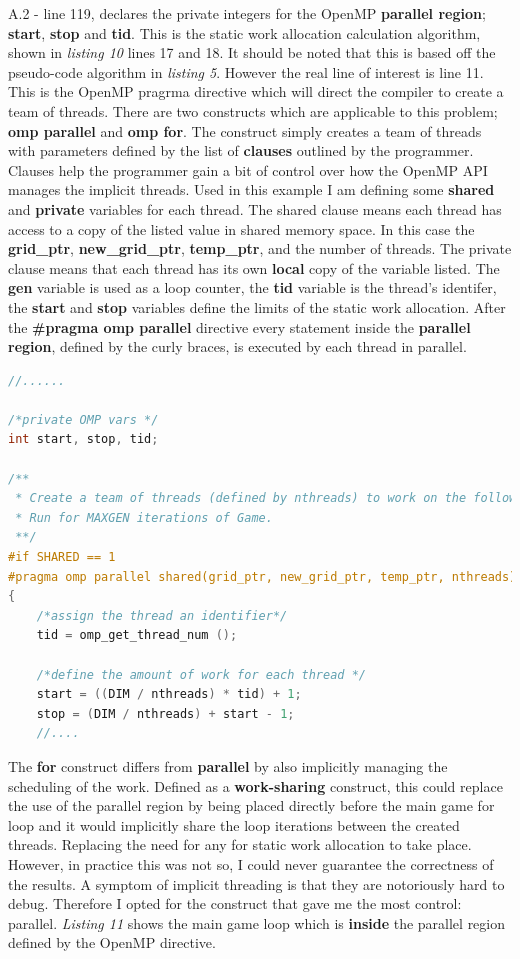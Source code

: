 \documentclass[11pt]{article} %
\begin{document}
A.2 - line 119, declares the private integers for the OpenMP {\bf parallel region}; {\bf start}, {\bf stop} and {\bf tid}. This is the static work allocation calculation algorithm, shown in {\it listing 10} lines 17 and 18. It should be noted that this is based off the pseudo-code algorithm in {\it listing 5}. However the real line of interest is line 11. This is the OpenMP pragrma directive which will direct the compiler to create a team of threads. There are two constructs which are applicable to this problem; {\bf omp parallel} and {\bf omp for}. The construct simply creates a team of threads with parameters defined by the list of {\bf clauses} outlined by the programmer. Clauses help the programmer gain a bit of control over how the OpenMP API manages the implicit threads. Used in this example I am defining some {\bf shared} and {\bf private} variables for each thread. The shared clause means each thread has access to a copy of the listed value in shared memory space. In this case the {\bf grid\_ptr}, {\bf new\_grid\_ptr}, {\bf temp\_ptr}, and the number of threads. The private clause means that each thread has its own {\bf local} copy of the variable listed. The {\bf gen} variable is used as a loop counter, the {\bf tid} variable is the thread's identifer, the {\bf start} and {\bf stop} variables define the limits of the static work allocation. After the {\bf \#pragma omp parallel} directive every statement inside the {\bf parallel region}, defined by the curly braces, is executed by each thread in parallel. 
\begin{lstlisting}[language=C, caption={OpenMP directive use and thread creation}]
//......

/*private OMP vars */
int start, stop, tid;

/**
 * Create a team of threads (defined by nthreads) to work on the following code.
 * Run for MAXGEN iterations of Game.
 **/
#if SHARED == 1
#pragma omp parallel shared(grid_ptr, new_grid_ptr, temp_ptr, nthreads) private(gen, tid, start, stop)  num_threads(nthreads)
{
	/*assign the thread an identifier*/
    tid = omp_get_thread_num ();

    /*define the amount of work for each thread */
    start = ((DIM / nthreads) * tid) + 1;
    stop = (DIM / nthreads) + start - 1;
    //....
\end{lstlisting}
The {\bf for} construct differs from {\bf parallel} by also implicitly managing the scheduling of the work. Defined as a {\bf work-sharing} construct, this could replace the use of the parallel region by being placed directly before the main game for loop and it would implicitly share the loop iterations between the created threads. Replacing the need for any for static work allocation to take place. However, in practice this was not so, I could never guarantee the correctness of the results. A symptom of implicit threading is that they are notoriously hard to debug. Therefore I opted for the construct that gave me the most control: parallel. {\it Listing 11} shows the main game loop which is {\bf inside} the parallel region defined by the OpenMP directive. 
\end{document}
